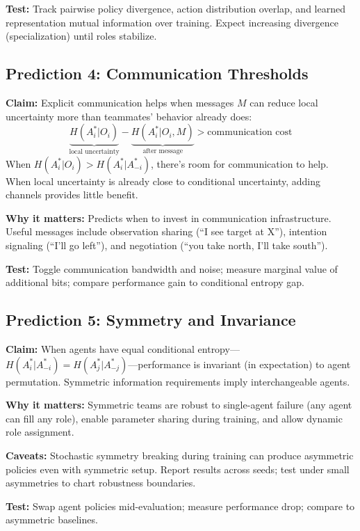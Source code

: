 \documentclass[10pt, letterpaper]{article}
\begin{document}
\textbf{Test:} Track pairwise policy divergence, action distribution overlap, and learned representation mutual information over training. Expect increasing divergence (specialization) until roles stabilize.

\subsection{Prediction 4: Communication Thresholds}
\label{pred:communication}

\textbf{Claim:} Explicit communication helps when messages $M$ can reduce local uncertainty more than teammates' behavior already does:
\[\underbrace{H(A_i^* | O_i)}_{\text{local uncertainty}} - \underbrace{H(A_i^* | O_i, M)}_{\text{after message}} > \text{communication cost}\]
When $H(A_i^*|O_i) > H(A_i^*|A_{-i}^*)$, there's room for communication to help. When local uncertainty is already close to conditional uncertainty, adding channels provides little benefit.

\textbf{Why it matters:} Predicts when to invest in communication infrastructure. Useful messages include observation sharing (``I see target at X''), intention signaling (``I'll go left''), and negotiation (``you take north, I'll take south'').

\textbf{Test:} Toggle communication bandwidth and noise; measure marginal value of additional bits; compare performance gain to conditional entropy gap.

\subsection{Prediction 5: Symmetry and Invariance}
\label{pred:symmetry}

\textbf{Claim:} When agents have equal conditional entropy---$H(A_i^*|A_{-i}^*) = H(A_j^*|A_{-j}^*)$---performance is invariant (in expectation) to agent permutation. Symmetric information requirements imply interchangeable agents.

\textbf{Why it matters:} Symmetric teams are robust to single-agent failure (any agent can fill any role), enable parameter sharing during training, and allow dynamic role assignment.

\textbf{Caveats:} Stochastic symmetry breaking during training can produce asymmetric policies even with symmetric setup. Report results across seeds; test under small asymmetries to chart robustness boundaries.

\textbf{Test:} Swap agent policies mid-evaluation; measure performance drop; compare to asymmetric baselines.
\end{document}
